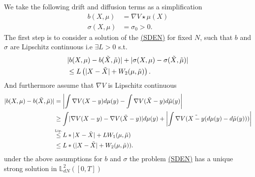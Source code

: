 \begin{example}
 We take the following drift and diffusion terms as a simplification
 \begin{align*}
   b(X,\mu )&= \nabla V \star  \mu(X)\\
   \sigma(X,\mu ) &= \sigma_0 >0
 .\end{align*}
 The first step is to consider a solution of the \hyperref[sden]{(SDEN)} for fixed $N$, such that 
 $b$ and $\sigma$ are Lipschitz continuous  i.e $\exists  L >0$ s.t.
 \begin{align*}
  &\lvert b(X,\mu ) - b(\tilde{X},\tilde{\mu }  )\rvert + \lvert\sigma(X,\mu ) - \sigma(\tilde{X},\tilde{\mu }  )\rvert \\
  &\le  L \left( \lvert X - \tilde{X} \rvert + W_2(\mu ,\tilde{\mu } ) \right) 
 .\end{align*}
  And furthermore  assume that $\nabla V $ is Lipschitz continuous
  \begin{align*}
    \abs{b(X,\mu ) - b(\tilde{X},\tilde{\mu }  )} &= \abs*{\int \nabla V(X-y) d\mu(y) - \int  \nabla V(\tilde{X}-y ) d \tilde{\mu }(y) }\\
                                                  &\ge \int \abs{\nabla V(X-y) - \nabla V(\tilde{X}-y )}d\mu (y) + \abs*{\int \nabla V(\tilde{X - y}(d\mu(y) - d \tilde{\mu }(y) ) )}\\
                                                  &\myS{Lip.}{\le }L*\abs{X - \tilde{X} } + LW_1(\mu ,\tilde{\mu } ) \\
                                                  &\le L*(\abs{X-\tilde{X} } + W_2(\mu,\tilde{\mu } ))
  .\end{align*}
  under the above assumptions for $b$ and $\sigma $ the problem \hyperref[sden]{(SDEN)} has a unique strong solution 
  in $\mathbb{L}^{2}_{dN}([0,T]) $\\[1ex]
\end{example}
